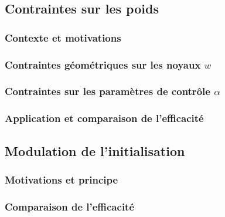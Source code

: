 \documentclass[12pt, twoside, letterpaper, french]{article}
\begin{document}
\subsection{Contraintes sur les poids} %

\subsubsection{Contexte et motivations}
\vspace{0.2cm}


\subsubsection{Contraintes géométriques sur les noyaux $w$}
\vspace{0.2cm}


\subsubsection{Contraintes sur les paramètres de contrôle $\alpha$}
\vspace{0.2cm}

\newpage

\subsubsection{Application et comparaison de l'efficacité}
\vspace{0.2cm}

\newpage

\subsection{Modulation de l'initialisation} %

\subsubsection{Motivations et principe}
\vspace{0.2cm}

\newpage

\subsubsection{Comparaison de l'efficacité}
\vspace{0.2cm}

\newpage
\end{document}

